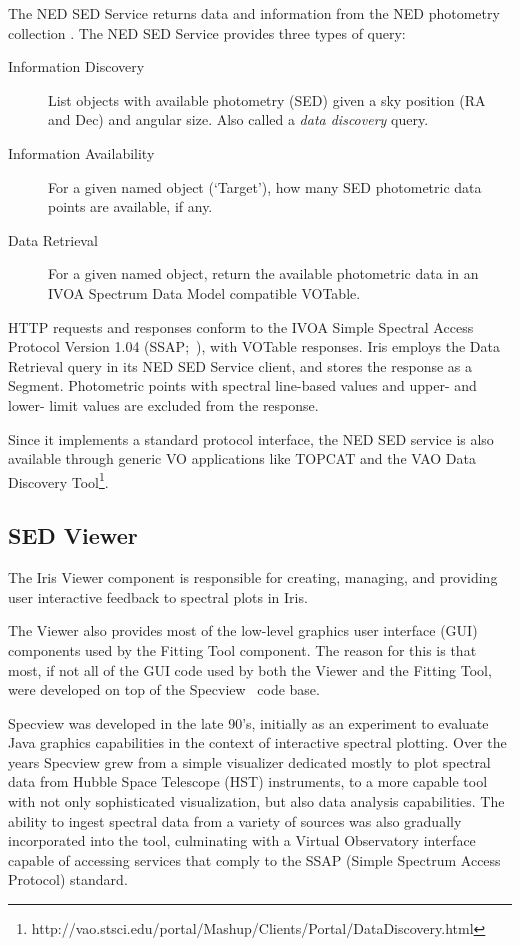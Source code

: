 \documentclass[final,5p]{elsarticle}
\begin{document}
The NED SED Service returns data and information from the NED photometry collection \citep{2007ASPC..376..153M}. The NED SED Service provides three types of query:
\begin{description}
 \item[Information Discovery] List objects with available photometry (SED) given a sky position (RA and Dec) and angular size.  Also called a \emph{data discovery} query.
 \item[Information Availability] For a given named object (`Target'), how many SED photometric data points are available, if any.
 \item[Data Retrieval] For a given named object, return the available photometric data in an IVOA Spectrum Data Model compatible VOTable.
\end{description}

HTTP requests and responses conform to the IVOA Simple Spectral Access Protocol Version 1.04 (SSAP;~\citep{2012arXiv1203.5725T}), with VOTable responses. Iris employs the Data Retrieval query in its NED SED Service client, and stores the response as a Segment. Photometric points with spectral line-based values and upper- and lower- limit values are excluded from the response.

Since it implements a standard protocol interface, the NED SED service is also available through generic VO applications like TOPCAT and the VAO Data Discovery Tool\footnote{http://vao.stsci.edu/portal/Mashup/Clients/Portal/DataDiscovery.html}.

\subsection{SED Viewer}
\label{subsec:specview}
The Iris Viewer component is responsible for creating, managing, and providing user interactive feedback to spectral plots in Iris.

The Viewer also provides most of the low-level graphics user interface (GUI) components used by the Fitting Tool component. The reason for this is that most, if not all of the GUI code used by both the Viewer and the Fitting Tool, were developed on top of the Specview~\citep{2002ASPC..281..120B} code base.

Specview was developed in the late 90's, initially as an experiment to evaluate Java graphics capabilities in the context of interactive spectral plotting. Over the years Specview grew from a simple visualizer dedicated mostly to plot spectral data from Hubble Space Telescope (HST) instruments, to a more capable tool with not only sophisticated visualization, but also data analysis capabilities. The ability to ingest spectral data from a variety of sources was also gradually incorporated into the tool, culminating with a Virtual Observatory interface capable of accessing services that comply to the SSAP (Simple Spectrum Access Protocol) standard.
\end{document}
